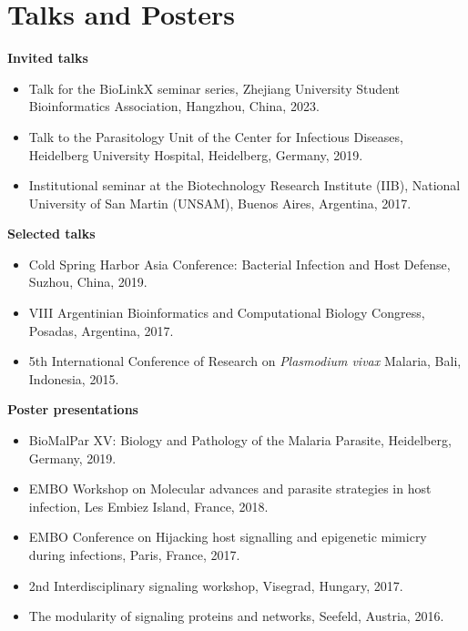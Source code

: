 \documentclass[11pt,a4paper,sans]{moderncv} %
\begin{document}
\section{Talks and Posters}
\vspace{-.1cm}
\textbf{Invited talks}
\begin{itemize}
  \item Talk for the BioLinkX seminar series, Zhejiang University Student Bioinformatics Association, Hangzhou, China, 2023.
  \item Talk to the Parasitology Unit of the Center for Infectious Diseases, Heidelberg University Hospital, Heidelberg, Germany, 2019.
  \item Institutional seminar at the Biotechnology Research Institute (IIB), National University of San Martin (UNSAM), Buenos Aires, Argentina, 2017.
\end{itemize}
\vspace{.1cm}
\textbf{Selected talks}
\begin{itemize}
  \item Cold Spring Harbor Asia Conference: Bacterial Infection and Host Defense, Suzhou, China, 2019.
  \item VIII Argentinian Bioinformatics and Computational Biology Congress, Posadas, Argentina, 2017.
  \item 5th International Conference of Research on \textit{Plasmodium vivax} Malaria, Bali, Indonesia, 2015.
\end{itemize}
\vspace{.1cm}
\textbf{Poster presentations}
\begin{itemize}
  \item BioMalPar XV: Biology and Pathology of the Malaria Parasite, Heidelberg, Germany, 2019.
  \item EMBO Workshop on Molecular advances and parasite strategies in host infection, Les Embiez Island, France, 2018.
  \item EMBO Conference on Hijacking host signalling and epigenetic mimicry during infections, Paris, France, 2017.
  \item 2nd Interdisciplinary signaling workshop, Visegrad, Hungary, 2017.
  \item The modularity of signaling proteins and networks, Seefeld, Austria, 2016. \\
\end{itemize}

\end{document}
